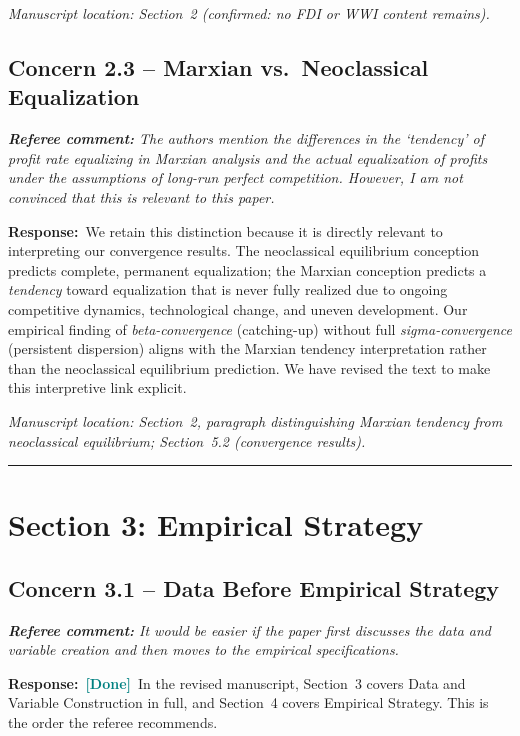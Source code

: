 \documentclass[11pt]{article}
\newcommand{\RC}[1]{\begin{refereebox}\textit{\textbf{Referee comment:} #1}\end{refereebox}}
\newcommand{\AR}{\noindent\textbf{Response:}\ }
\newcommand{\done}{\textcolor{teal}{\textbf{[Done]}}}
\begin{document}
\smallskip\noindent\textit{Manuscript location: Section~2 (confirmed: no FDI or WWI content remains).}

\subsection*{Concern 2.3 -- Marxian vs.\ Neoclassical Equalization}

\RC{The authors mention the differences in the `tendency' of profit rate equalizing in Marxian analysis and the actual equalization of profits under the assumptions of long-run perfect competition. However, I am not convinced that this is relevant to this paper.}

\AR We retain this distinction because it is directly relevant to interpreting our convergence results. The neoclassical equilibrium conception predicts complete, permanent equalization; the Marxian conception predicts a \emph{tendency} toward equalization that is never fully realized due to ongoing competitive dynamics, technological change, and uneven development. Our empirical finding of \emph{beta-convergence} (catching-up) without full \emph{sigma-convergence} (persistent dispersion) aligns with the Marxian tendency interpretation rather than the neoclassical equilibrium prediction. We have revised the text to make this interpretive link explicit.

\smallskip\noindent\textit{Manuscript location: Section~2, paragraph distinguishing Marxian tendency from neoclassical equilibrium; Section~5.2 (convergence results).}

\bigskip\noindent\rule{\textwidth}{0.4pt}\bigskip

\section*{Section 3: Empirical Strategy}

\subsection*{Concern 3.1 -- Data Before Empirical Strategy}

\RC{It would be easier if the paper first discusses the data and variable creation and then moves to the empirical specifications.}

\AR \done\ In the revised manuscript, Section~3 covers Data and Variable Construction in full, and Section~4 covers Empirical Strategy. This is the order the referee recommends.
\end{document}
